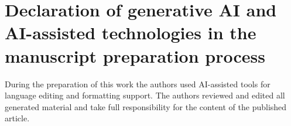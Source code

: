 \documentclass[preprint,12pt]{elsarticle}
\begin{document}
\section*{Declaration of generative AI and AI-assisted technologies in the manuscript preparation process}
During the preparation of this work the authors used AI-assisted tools for language editing and formatting support. The authors reviewed and edited all generated material and take full responsibility for the content of the published article.



\end{document}
